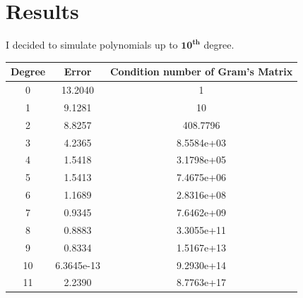 \section{Results}

I decided to simulate polynomials up to $\mathbf{10^{th}}$ degree.














\begin{center}
  \begin{tabular}{| c | c | c |}
\hline

Degree & Error & Condition number of Gram's Matrix \\
\hline
0& 13.2040& 1\\
\hline
1& 9.1281& 10\\
\hline
2& 8.8257&   408.7796\\
\hline
3& 4.2365& 8.5584e+03\\
\hline
4& 1.5418&  3.1798e+05\\
\hline
5& 1.5413& 7.4675e+06\\
\hline
6& 1.1689& 2.8316e+08\\
\hline
7& 0.9345& 7.6462e+09\\
\hline
8& 0.8883& 3.3055e+11\\
\hline
9& 0.8334& 1.5167e+13\\
\hline
10& 6.3645e-13& 9.2930e+14\\
\hline
11 & 2.2390 & 8.7763e+17 \\
\hline
  \end{tabular}
\end{center}

